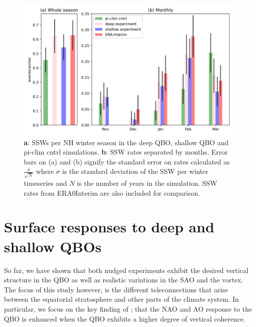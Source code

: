 \begin{figure}[h!]
\begin{center}
\noindent\includegraphics[width = 0.8\linewidth]{Figures/Figures-deepQBO/SSW_hist.png}
\caption[SSWs per NH winter season in QBO experiments]{\textbf{a}: SSWs per NH winter season in the deep QBO, shallow QBO and pi-clim cntrl simulations. \textbf{b}: SSW rates separated by months. Error bars on (a) and (b) signify the standard error on rates calculated as $\frac{\sigma}{\sqrt{N}}$ where $\sigma$ is the standard deviation of the SSW per winter timeseries and $N$ is the number of years in the simulation. SSW rates from ERA0Interim are also included for comparison.}
\label{fig:SSW_histogram_experiments}
\end{center}
\end{figure}

\newpage

\section{Surface responses to deep and shallow QBOs}
\label{sec:MSLP_responses}
So far, we have shown that both nudged experiments exhibit the desired vertical structure in the QBO as well as realistic variations in the SAO and the vortex. The focus of this study however, is the different teleconnections that arise between the equatorial stratosphere and other parts of the climate system. In particular, we focus on the key finding of \cite{andrewsObserved2019d}; that the NAO and AO response to the QBO is enhanced when the QBO exhibits a higher degree of vertical coherence. 

